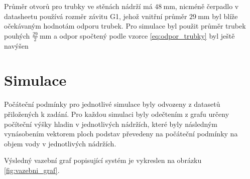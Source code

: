 \documentclass[twoside]{article}
\begin{document}
Průměr otvorů pro trubky ve stěnách nádrží má $ 48~\si{\milli\metre}$, nicméně čerpadlo v datasheetu používá rozměr závitu G1,
jehož vnitřní průměr $ 29~\si{\milli\metre}$ byl blíže očekávaným hodnotám odporu trubek.
Pro simulace byl použit průměr trubek pouhých $ \frac{29}{2}~\si{\milli\metre}$ a odpor spočtený podle vzorce \eqref{eq:odpor_trubky}
byl ještě navýšen 




\section{Simulace}

Počáteční podmínky pro jednotlivé simulace byly odvozeny z datasetů přiložených k zadání.
Pro každou simulaci byly odečtením z grafu určeny počíteční výšky hladin v jednotlivých
nádržích, které byly následným vynásobením vektorem ploch podstav převedeny na počáteční podmínky
na objem vody v jednotlivých nádržích.

Výsledný vazební graf popisující systém je vykreslen na obrázku \ref{fig:vazebni_graf}.
\end{document}
